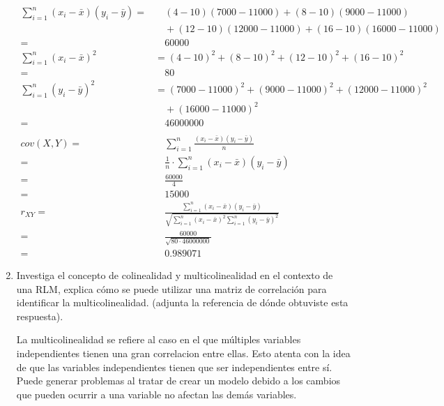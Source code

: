 \documentclass[]{article}
\begin{document}
\begin{enumerate}
    \begin{equation}
        \begin{split}
            \sum_{i=1}^{n}(x_{i} - \bar{x})(y_{i} - \bar{y}) =&\quad (4 - 10)(7000 - 11000) + (8 - 10)(9000 - 11000) \\ 
                        &\quad + (12 - 10)(12000 - 11000) + (16 - 10)(16000 - 11000)\\
                       =&\quad 60000\\
            \sum_{i=1}^{n}(x_{i} - \bar{x})^2 & = (4 - 10)^2 + (8 - 10)^2 + (12 - 10)^2 + (16 - 10)^2\\
                      =&\quad 80\\
            \sum_{i=1}^{n}(y_{i} - \bar{y})^2 & = (7000 - 11000)^2 + (9000 - 11000)^2 + (12000 - 11000)^2\\
                       &\quad + (16000 - 11000)^2\\
                      =&\quad 46000000\\
                      \\
            cov(X, Y) =&\quad \sum_{i=1}^{n}\frac{(x_{i} - \bar{x})(y_{i} - \bar{y})}{n}\\
                      =&\quad \frac{1}{n}\cdot\sum_{i=1}^{n}(x_{i} - \bar{x})(y_{i} - \bar{y})\\
                      =&\quad \frac{60000}{4}\\
                      =&\quad 15000\\
            r_{XY} =&\quad \frac{\sum_{i=1}^{n}(x_{i} - \bar{x})(y_{i} - \bar{y})}{\sqrt{\sum_{i=1}^{n}(x_{i} - \bar{x})^2\sum_{i=1}^{n}(y_{i} - \bar{y})^2}}\\
                   =&\quad \frac{60000}{\sqrt{80 \cdot 46000000}}\\
                   =&\quad 0.989071
        \end{split}
    \end{equation}


    \item Investiga el concepto de colinealidad y multicolinealidad en el contexto de una RLM,
    explica cómo se puede utilizar una matriz de correlación para identificar la
    multicolinealidad. (adjunta la referencia de dónde obtuviste esta respuesta). 
    
    La multicolinealidad se refiere al caso en el que múltiples variables independientes tienen 
    una gran correlacion entre ellas. Esto atenta con la idea de que las variables independientes 
    tienen que ser independientes entre sí. Puede generar problemas al tratar de crear un modelo 
    debido a los cambios que pueden ocurrir a una variable no afectan las demás variables.


\end{enumerate}
\end{document}
